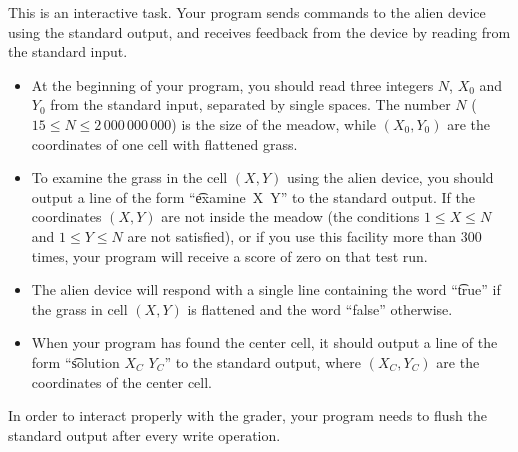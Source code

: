 This is an interactive task. Your program sends commands to the alien device using the standard output, and receives feedback from the device by reading from the standard input.

\begin{itemize}
\item At the beginning of your program, you should read three integers $N$, $X_0$ and $Y_0$ from the standard input, separated by single spaces. The number $N$ ($15 \le N \le 2\,000\,000\,000$) is the size of the meadow, while $(X_0, Y_0)$ are the coordinates
of one cell with flattened grass.

\item To examine the grass in the cell $(X, Y)$ using the alien device, you should output a line of the form ``\t{examine~X~Y}'' to the standard output. If the coordinates $(X, Y)$ are not inside the meadow (the conditions $1 \le X \le N$ and $1 \le Y \le N$ are not satisfied), or if you use this facility more than $300$ times,
your program will receive a score of zero on that test run.

\item The alien device will respond with a single line containing the word ``\t{true}'' if the grass in cell $(X, Y)$ is flattened and the word ``false'' otherwise.

\item When your program has found the center cell, it should output a line of the form ``\t{solution $X_C$ $Y_C$}'' to
the standard output, where $(X_C, Y_C)$ are the coordinates of the center cell. 
\end{itemize}

In order to interact properly with the grader, your program needs to flush the standard output after every write operation. 

